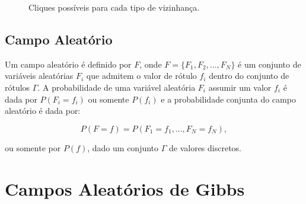 \begin{figure}[H]
	\centering
	
	\caption{Cliques possíveis para cada tipo de vizinhança.}
	
	
	
	
	\label{fig:imgApendiceAClique}
\end{figure}

\section{Campo Aleatório}\label{ApendiceA:CampoAleatorio}

Um campo aleatório é definido por $F$, onde $F = \{F_{1},F_{2},...,F_{N}\}$ é um conjunto de variáveis aleatórias $F_{i}$ que admitem o valor de rótulo $f_{i}$ dentro do conjunto de rótulos $\varGamma$. A probabilidade de uma variável aleatória $F_{i}$ assumir um valor $f_{i}$ é dada por $P(F_{i} = f_{i} )$ ou somente $P(f_{i})$ e a probabilidade conjunta do campo aleatório é dada por:

\begin{equation}
	P(F = f) = P(F_{1}=f_{1},...,F_{N}=f_{N}),
	\label{eq:eqApendiceAProbCampoAleatorio}
\end{equation}  

\noindent ou somente por $P(f)$, dado um conjunto $\varGamma$ de valores discretos.

\chapter{Campos Aleatórios de Gibbs}\label{ApendiceB:CamposAleatóriosdeGibbs}

